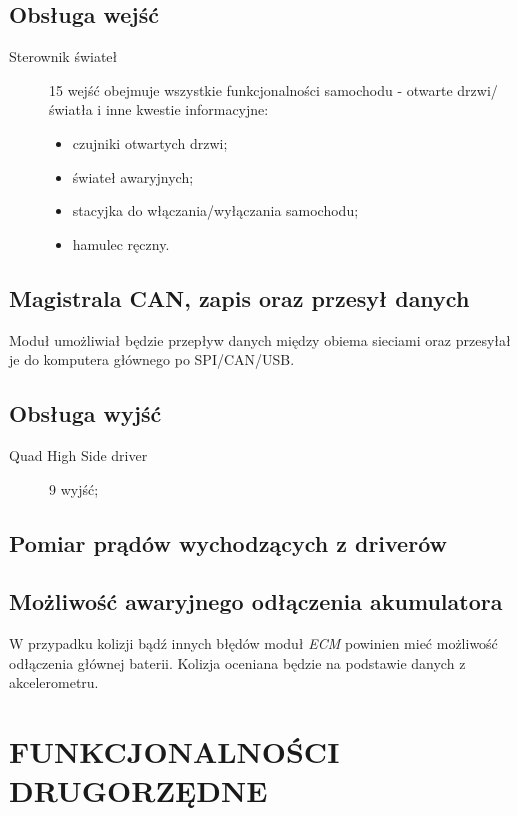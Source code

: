 \documentclass[12pt, a4paper, polish]{article}
\begin{document}
	\subsection{Obsługa wejść}
	\begin{description}
		\item[Sterownik świateł] 15 wejść obejmuje wszystkie funkcjonalności samochodu - otwarte drzwi/światła i inne kwestie informacyjne:
		\begin{itemize}
			\item czujniki otwartych drzwi;
			\item świateł awaryjnych;
			\item stacyjka do włączania/wyłączania samochodu;
			\item hamulec ręczny.		
		\end{itemize}
	\end{description}
	
	\subsection{Magistrala CAN, zapis oraz przesył danych}
	Moduł umożliwiał będzie przepływ danych między obiema sieciami oraz przesyłał je do komputera głównego po SPI/CAN/USB. 
	
	\subsection{Obsługa wyjść}   
	\begin{description}
		\item[Quad High Side driver] 9 wyjść;
	\end{description}
	
	\subsection{Pomiar prądów wychodzących z driverów}
	
	
	\subsection{Możliwość awaryjnego odłączenia akumulatora}
	W przypadku kolizji bądź innych błędów moduł \textit{ECM} powinien mieć możliwość odłączenia głównej baterii. Kolizja oceniana będzie na podstawie danych z akcelerometru.
	
	\section{FUNKCJONALNOŚCI DRUGORZĘDNE}
\end{document}
